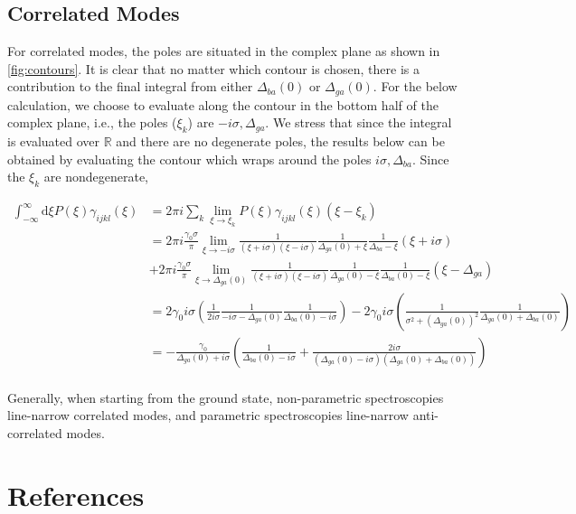 \documentclass[aip, jcp, reprint, onecolumn, nofootinbib]{revtex4-2}
\begin{document}
\subsection{Correlated Modes}
For correlated modes, the poles are situated in the complex plane as shown in \autoref{fig:contours}.
It is clear that no matter which contour is chosen, there is a contribution to the final integral from either $\Delta_{ba}(0)$ or $\Delta_{ga}(0)$. 
For the below calculation, we choose to evaluate along the contour in the bottom half of the complex plane, i.e., the poles ($\xi_k$) are $-i\sigma, \Delta_{ga}$.
We stress that since the integral is evaluated over $\mathbb{R}$ and there are no degenerate poles, the results below can be obtained by evaluating the contour which wraps around the poles $i\sigma, \Delta_{ba}$. 
Since the $\xi_k$ are nondegenerate,
\begin{widetext}
	\begin{equation}
		\begin{split}
			\int_{-\infty}^\infty \mathrm{d}\xi P(\xi) \gamma_{ijkl}(\xi) &= 2\pi i \sum_k \lim_{\xi \rightarrow \xi_k} P(\xi) \gamma_{ijkl}(\xi) (\xi - \xi_k)\\
			&= 2\pi i \frac{\gamma_0 \sigma}{\pi}  \lim_{\xi \rightarrow -i\sigma} \frac{1}{(\xi + i\sigma)(\xi - i\sigma)} \frac{1}{\Delta_{ga}(0) + \xi} \frac{1}{\Delta_{ba} - \xi} \left(\xi + i \sigma\right) \\ 
			&+ 2\pi i \frac{\gamma_0 \sigma}{\pi} \lim_{\xi \rightarrow \Delta_{ga}(0)} \frac{1}{(\xi + i\sigma)(\xi - i\sigma)} \frac{1}{\Delta_{ga}(0) - \xi} \frac{1}{\Delta_{ba}(0) - \xi} \left(\xi - \Delta_{ga}\right)\\
			&= 2 \gamma_0 i \sigma \left(\frac{1}{2 i \sigma} \frac{1}{-i \sigma - \Delta_{ga}(0)} \frac{1}{\Delta_{ba}(0) - i\sigma} \right) - 2 \gamma_0 i \sigma \left(\frac{1}{\sigma^2 + (\Delta_{ga} (0))^2} \frac{1}{\Delta_{ga}(0) + \Delta_{ba}(0)} \right)\\
			&= -\frac{\gamma_0}{\Delta_{ga}(0) + i \sigma} \left(\frac{1}{\Delta_{ba}(0) - i \sigma} + \frac{2i\sigma}{(\Delta_{ga}(0) - i \sigma)(\Delta_{ga}(0) + \Delta_{ba}(0))}\right)\\
		\end{split}
	\end{equation}
\end{widetext}
Generally, when starting from the ground state, non-parametric spectroscopies line-narrow correlated modes, and parametric spectroscopies line-narrow anti-correlated modes. \cite{Dick83_1, RN425}




\section{References}

\end{document}
